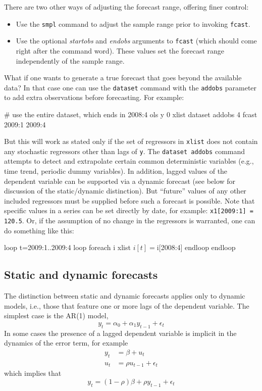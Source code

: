 There are two other ways of adjusting the forecast range, offering
finer control:
%
\begin{itemize}
\item Use the \texttt{smpl} command to adjust the sample range
  prior to invoking \texttt{fcast}.
\item Use the optional \textsl{startobs} and \textsl{endobs} arguments
  to \texttt{fcast} (which should come right after the command word).
  These values set the forecast range independently of the
  sample range.
\end{itemize}

What if one wants to generate a true forecast that goes beyond the
available data?  In that case one can use the \texttt{dataset} command
with the \texttt{addobs} parameter to add extra observations before 
forecasting.  For example:
%
\begin{code}
# use the entire dataset, which ends in 2008:4
ols y 0 xlist
dataset addobs 4
fcast 2009:1 2009:4
\end{code}
%
But this will work as stated only if the set of regressors in
\texttt{xlist} does not contain any stochastic regressors other than
lags of \texttt{y}.  The \texttt{dataset addobs} command attempts to detect
and extrapolate certain common deterministic variables (e.g., time
trend, periodic dummy variables).  In addition, lagged values of the
dependent variable can be supported via a dynamic forecast (see below
for discussion of the static/dynamic distinction).  But ``future''
values of any other included regressors must be supplied before such a
forecast is possible.  Note that specific values in a series can be
set directly by date, for example: \texttt{x1[2009:1] = 120.5}.  Or,
if the assumption of no change in the regressors is warranted, one can
do something like this:
%
\begin{code}
loop t=2009:1..2009:4
    loop foreach i xlist
        $i[t] = $i[2008:4]
    endloop
endloop
\end{code}


\subsection{Static and dynamic forecasts}

The distinction between static and dynamic forecasts applies only to
dynamic models, i.e., those that feature one or more lags of the
dependent variable. The simplest case is the AR(1) model,
%
\begin{equation}
\label{eq:ar1}
y_t = \alpha_0 + \alpha_1 y_{t-1} + \epsilon_t
\end{equation}
%
In some cases the presence of a lagged dependent variable is implicit
in the dynamics of the error term, for example
%
\begin{align*}
  y_t &=  \beta + u_t \\
  u_t &= \rho u_{t-1} + \epsilon_t
\end{align*}
%
which implies that
%
\[
y_t = (1-\rho) \beta + \rho y_{t-1} + \epsilon_t
\]

